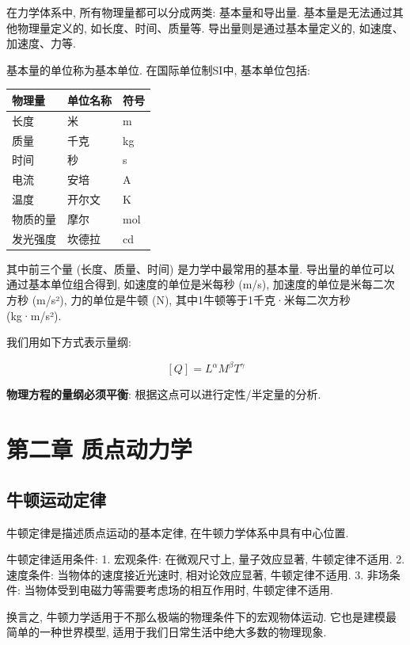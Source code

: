 \documentclass[
  a4paper,
]{ctexrep}
\begin{document}
在力学体系中, 所有物理量都可以分成两类: 基本量和导出量.
基本量是无法通过其他物理量定义的, 如长度、时间、质量等.
导出量则是通过基本量定义的, 如速度、加速度、力等.

基本量的单位称为基本单位. 在国际单位制SI中, 基本单位包括:

\begin{longtable}[]{@{}lll@{}}
\toprule\noalign{}
物理量 & 单位名称 & 符号 \\
\midrule\noalign{}
\endhead
\bottomrule\noalign{}
\endlastfoot
长度 & 米 & m \\
质量 & 千克 & kg \\
时间 & 秒 & s \\
电流 & 安培 & A \\
温度 & 开尔文 & K \\
物质的量 & 摩尔 & mol \\
发光强度 & 坎德拉 & cd \\
\end{longtable}

其中前三个量 (长度、质量、时间) 是力学中最常用的基本量.
导出量的单位可以通过基本单位组合得到, 如速度的单位是米每秒 (m/s),
加速度的单位是米每二次方秒 (m/s²), 力的单位是牛顿 (N),
其中1牛顿等于1千克·米每二次方秒 (kg·m/s²).

我们用如下方式表示量纲:

\[[Q] = L^{\alpha} M^{\beta} T^{\gamma}\]

\textbf{物理方程的量纲必须平衡}: 根据这点可以进行定性/半定量的分析.

\chapter{第二章
质点动力学}\label{ux7b2cux4e8cux7ae0-ux8d28ux70b9ux52a8ux529bux5b66}

\section{牛顿运动定律}\label{ux725bux987fux8fd0ux52a8ux5b9aux5f8b}

牛顿定律是描述质点运动的基本定律, 在牛顿力学体系中具有中心位置.

牛顿定律适用条件: 1. 宏观条件: 在微观尺寸上, 量子效应显著,
牛顿定律不适用. 2. 速度条件: 当物体的速度接近光速时, 相对论效应显著,
牛顿定律不适用. 3. 非场条件: 当物体受到电磁力等需要考虑场的相互作用时,
牛顿定律不适用.

换言之, 牛顿力学适用于不那么极端的物理条件下的宏观物体运动.
它也是建模最简单的一种世界模型, 适用于我们日常生活中绝大多数的物理现象.
\end{document}
